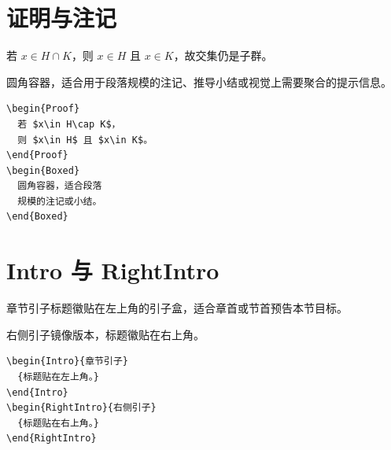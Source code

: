 \section{证明与注记}

\begin{fullwidth}
\begin{minipage}[t]{0.48\linewidth}
\begin{Proof}
若 $x\in H\cap K$，则 $x\in H$ 且 $x\in K$，故交集仍是子群。
\end{Proof}
\begin{Boxed}
圆角容器，适合用于段落规模的注记、推导小结或视觉上需要聚合的提示信息。
\end{Boxed}
\end{minipage}\hfill
\begin{minipage}[t]{0.48\linewidth}
\begin{lstlisting}[language={[LaTeX]TeX}]
\begin{Proof}
  若 $x\in H\cap K$，
  则 $x\in H$ 且 $x\in K$。
\end{Proof}
\begin{Boxed}
  圆角容器，适合段落
  规模的注记或小结。
\end{Boxed}
\end{lstlisting}
\end{minipage}
\end{fullwidth}

\section{Intro 与 RightIntro}

\begin{fullwidth}
\begin{minipage}[t]{0.48\linewidth}
\begin{Intro}{章节引子}{标题徽贴在左上角的引子盒，适合章首或节首预告本节目标。}
\end{Intro}
\begin{RightIntro}{右侧引子}{镜像版本，标题徽贴在右上角。}
\end{RightIntro}
\end{minipage}\hfill
\begin{minipage}[t]{0.48\linewidth}
\begin{lstlisting}[language={[LaTeX]TeX}]
\begin{Intro}{章节引子}
  {标题贴在左上角。}
\end{Intro}
\begin{RightIntro}{右侧引子}
  {标题贴在右上角。}
\end{RightIntro}
\end{lstlisting}
\end{minipage}
\end{fullwidth}

